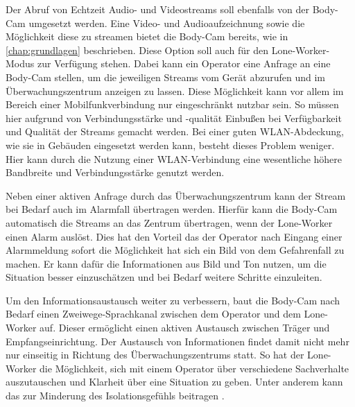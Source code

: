 \documentclass[thesis.tex]{subfiles}
\begin{document}
Der Abruf von Echtzeit Audio- und Videostreams soll ebenfalls von der Body-Cam umgesetzt werden.
Eine Video- und Audioaufzeichnung sowie die Möglichkeit diese zu streamen bietet die Body-Cam bereits, wie in \autoref{chap:grundlagen} beschrieben.
Diese Option soll auch für den Lone-Worker-Modus zur Verfügung stehen.
Dabei kann ein Operator eine Anfrage an eine Body-Cam stellen, um die jeweiligen Streams vom Gerät abzurufen und im Überwachungszentrum anzeigen zu lassen.
Diese Möglichkeit kann vor allem im Bereich einer Mobilfunkverbindung nur eingeschränkt nutzbar sein.
So müssen hier aufgrund von Verbindungsstärke und -qualität Einbußen bei Verfügbarkeit und Qualität der Streams gemacht werden.
Bei einer guten WLAN-Abdeckung, wie sie in Gebäuden eingesetzt werden kann, besteht dieses Problem weniger.
Hier kann durch die Nutzung einer WLAN-Verbindung eine wesentliche höhere Bandbreite und Verbindungsstärke genutzt werden.

Neben einer aktiven Anfrage durch das Überwachungszentrum kann der Stream bei Bedarf auch im Alarmfall übertragen werden.
Hierfür kann die Body-Cam automatisch die Streams an das Zentrum übertragen, wenn der Lone-Worker einen Alarm auslöst.
Dies hat den Vorteil das der Operator nach Eingang einer Alarmmeldung sofort die Möglichkeit hat sich ein Bild von dem Gefahrenfall zu machen.
Er kann dafür die Informationen aus Bild und Ton nutzen, um die Situation besser einzuschätzen und bei Bedarf weitere Schritte einzuleiten.

Um den Informationsaustausch weiter zu verbessern, baut die Body-Cam nach Bedarf einen Zweiwege-Sprachkanal zwischen dem Operator und dem Lone-Worker auf.
Dieser ermöglicht einen aktiven Austausch zwischen Träger und Empfangseinrichtung.
Der Austausch von Informationen findet damit nicht mehr nur einseitig in Richtung des Überwachungszentrums statt.
So hat der Lone-Worker die Möglichkeit, sich mit einem Operator über verschiedene Sachverhalte auszutauschen und Klarheit über eine Situation zu geben.
Unter anderem kann das zur Minderung des Isolationsgefühls beitragen \cite[vgl. S.45]{GeyerMagiera2022}.
\end{document}
